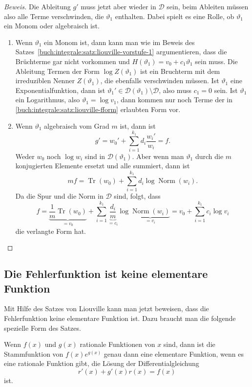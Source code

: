 \begin{proof}[Beweis]
Die Ableitung $g'$ muss jetzt aber wieder in $\mathscr{D}$ sein, beim
Ableiten müssen also alle Terme verschwinden, die $\vartheta_1$ enthalten.
Dabei spielt es eine Rolle, ob $\vartheta_1$ ein Monom oder algebraisch ist.
\begin{enumerate}
\item
Wenn $\vartheta_1$ ein Monom ist, dann kann man wie im Beweis des
Satzes~\ref{buch:integrale:satz:liouville-vorstufe-1} argumentieren,
dass die Brüchterme gar nicht vorkommen und
$H(\vartheta_1)=v_0+c_1\vartheta_1$ sein muss.
Die Ableitung Termen der Form $\log Z(\vartheta_1)$ ist ein Bruchterm
mit dem irreduziblen Nenner $Z(\vartheta_1)$, die ebenfalls verschwinden
müssen.
Ist $\vartheta_1$ eine Exponentialfunktion, dann ist
$\vartheta_1' \in \mathscr{D}(\vartheta_1)\setminus\mathscr{D}$, also muss
$c_1=0$ sein.
Ist  $\vartheta_1$ ein Logarithmus, also $\vartheta_1=\log v_1$, dann
kommen nur noch Terme der in 
\eqref{buch:integrale:satz:liouville-fform}
erlaubten Form vor.

\item
Wenn $\vartheta_1$ algebraisch vom Grad $m$ ist, dann ist
\[
g' = w_0' + \sum_{i=1}^{k_1} d_i\frac{w_i'}{w_i} = f.
\]
Weder $w_0$ noch $\log w_i$ sind in $\mathscr{D}(\vartheta_1)$.
Aber wenn man $\vartheta_1$ durch die $m$ konjugierten Elemente
ersetzt und alle summiert, dann ist
\[
mf
=
\operatorname{Tr}(w_0) + \sum_{i=1}^{k_1} d_i \log\operatorname{Norm}(w_i).
\]
Da die Spur und die Norm in $\mathscr{D}$ sind, folgt, dass
\[
f
=
\underbrace{\frac{1}{m}
\operatorname{Tr}(w_0)}_{\displaystyle= v_0}
+
\sum_{i=1}^{k_1} \underbrace{\frac{d_i}{m}}_{\displaystyle=c_i}
\log
\underbrace{ \operatorname{Norm}(w_i)}_{\displaystyle=v_i}
=
v_0 + \sum_{i=1}^{k_1} c_i\log v_i
\]
die verlangte Form hat.
\qedhere
\end{enumerate}
\end{proof}

\subsection{Die Fehlerfunktion ist keine elementare Funktion
\label{buch:integrale:section:fehlernichtelementar}}
Mit Hilfe des Satzes von Liouville kann man jetzt beweisen, dass 
die Fehlerfunktion keine elementare Funktion ist.
Dazu braucht man die folgende spezielle Form des Satzes.

\begin{satz}
\label{buch:integrale:satz:elementarestammfunktion}
Wenn $f(x)$ und $g(x)$ rationale Funktionen von $x$ sind, dann
ist die Stammfunktion von $f(x)e^{g(x)}$ genau dann eine 
elementare Funktion, wenn es eine rationale Funktion gibt, die
Lösung der Differentialgleichung
\[
r'(x) + g'(x)r(x)=f(x)
\]
ist.
\end{satz}


